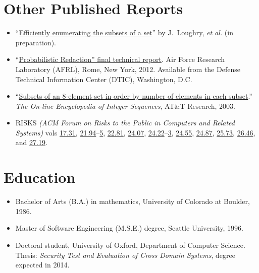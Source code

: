 \documentclass[12pt,twoside,letterpaper]{article}
\begin{document}
\vspace{-8mm}
\section*{Other Published Reports}
\vspace{-2mm}
\begin{itemize}
	\item ``\href{http://www.applied-math.org/subset.pdf}{Efficiently
		enumerating the subsets of a set}'' by J.\ Loughry, {\it et al.}
		(in preparation).

	\item ``\href{http://applied-math.org/Loughry2011.pdf}{Probabilistic
		Redaction'' final technical report}. Air Force Research Laboratory
		(AFRL), Rome, New York, 2012. Available from the Defense Technical
		Information Center (DTIC), Washington, D.C.

	\item ``\href{http://oeis.org/A047869}{Subsets of an 8-element set
		in order by number of elements in each subset}.'' \emph{The On-line
		Encyclopedia of Integer Sequences}, AT\&T Research, 2003.

    \item RISKS \emph{(ACM Forum on Risks to the Public in Computers
    and Related Systems)} vols
	\href{http://catless.ncl.ac.uk/Risks/17.31.html}{17.31},
	\href{http://catless.ncl.ac.uk/Risks/21.94.html}{21.94}--\href{http://catless.ncl.ac.uk/Risks/21.95.html}{5},
	\href{http://catless.ncl.ac.uk/Risks/21.81.html}{22.81},
	\href{http://catless.ncl.ac.uk/Risks/24.07.html}{24.07},
    \href{http://catless.ncl.ac.uk/Risks/24.22.html}{24.22}--\href{http://catless.ncl.ac.uk/Risks/24.23.html}{3},
	\href{http://catless.ncl.ac.uk/Risks/24.55.html}{24.55},
	\href{http://catless.ncl.ac.uk/Risks/24.87.html}{24.87},
	\href{http://catless.ncl.ac.uk/Risks/25.73.html}{25.73},
	\href{http://catless.ncl.ac.uk/Risks/26.46.html}{26.46},
	and \href{http://catless.ncl.ac.uk/Risks/27.19.html}{27.19}.
\end{itemize}

\vspace{-8mm}
\section*{Education}
\vspace{-2mm}
\begin{itemize}
    \item Bachelor of Arts (B.A.) in mathematics,
		University of Colorado at Boulder, 1986.
    \item Master of Software Engineering (M.S.E.) degree,
		Seattle University, 1996.
    \item Doctoral student, University of Oxford, Department of
		Computer Science.  Thesis: \emph{Security Test and
		Evaluation of Cross Domain Systems}, degree expected in 2014.
\end{itemize}
\end{document}
